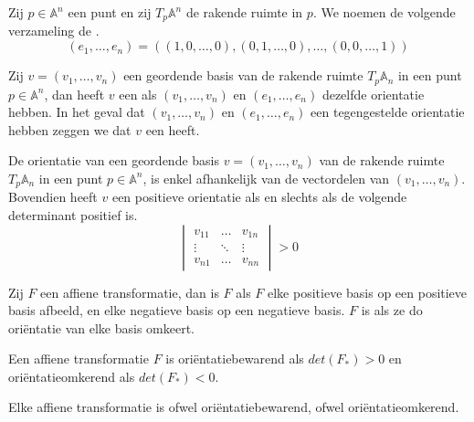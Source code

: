 \documentclass[main.tex]{subfiles}
\begin{document}
\begin{de}
  Zij $p\in \mathbb{A}^{n}$ een punt en zij $T_{p}\mathbb{A}^{n}$ de rakende ruimte in $p$.
  We noemen de volgende verzameling de .
  \[
  (e_{1},\dotsc, e_{n}) =
  (
    (1,0,\dotsc,0),
    (0,1,\dotsc,0),
    \dotsc,
    (0,0,\dotsc,1)
    )
  \]
\end{de}

\begin{de}
  Zij $v = (v_{1},\dotsc,v_{n})$ een geordende basis van de rakende ruimte $T_{p}\mathbb{A}_{n}$ in een punt $p\in \mathbb{A}^{n}$, dan heeft $v$ een  als $(v_{1},\dotsc,v_{n})$ en $(e_{1},\dotsc, e_{n})$ dezelfde orientatie hebben. In het geval dat $(v_{1},\dotsc,v_{n})$ en $(e_{1},\dotsc, e_{n})$ een tegengestelde orientatie hebben zeggen we dat $v$ een  heeft.
\end{de}

\begin{st}
  De orientatie van een geordende basis $v = (v_{1},\dotsc,v_{n})$ van de rakende ruimte $T_{p}\mathbb{A}_{n}$ in een punt $p\in \mathbb{A}^{n}$, is enkel afhankelijk van de vectordelen van $(v_{1},\dotsc,v_{n})$.
  Bovendien heeft $v$ een positieve orientatie als en slechts als de volgende determinant positief is.
  \[ 
  \begin{vmatrix}
    v_{11} & \hdots & v_{1n} \\
    \vdots & \ddots & \vdots \\
    v_{n1} & \hdots & v_{nn}
  \end{vmatrix}
  > 0
  \]
\end{st}

\begin{de}
  Zij $F$ een affiene transformatie, dan is $F$  als $F$ elke positieve basis op een positieve basis afbeeld, en elke negatieve basis op een negatieve basis.
  $F$ is  als ze do ori\"entatie van elke basis omkeert.
\end{de}

\begin{st}
  Een affiene transformatie $F$ is ori\"entatiebewarend als $det(F_{*}) > 0$ en ori\"entatieomkerend als $det(F_{*}) < 0$.
\end{st}

\begin{st}
  Elke affiene transformatie is ofwel ori\"entatiebewarend, ofwel ori\"entatieomkerend.
\end{st}
\end{document}
